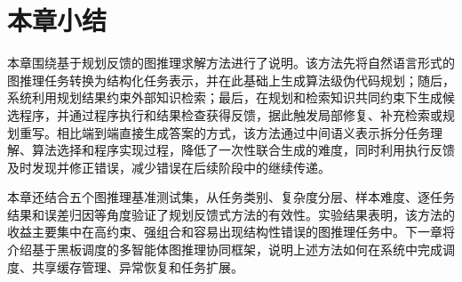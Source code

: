 

\section{本章小结}

本章围绕基于规划反馈的图推理求解方法进行了说明。该方法先将自然语言形式的图推理任务转换为结构化任务表示，并在此基础上生成算法级伪代码规划；随后，系统利用规划结果约束外部知识检索；最后，在规划和检索知识共同约束下生成候选程序，并通过程序执行和结果检查获得反馈，据此触发局部修复、补充检索或规划重写。相比端到端直接生成答案的方式，该方法通过中间语义表示拆分任务理解、算法选择和程序实现过程，降低了一次性联合生成的难度，同时利用执行反馈及时发现并修正错误，减少错误在后续阶段中的继续传递。

本章还结合五个图推理基准测试集，从任务类别、复杂度分层、样本难度、逐任务结果和误差归因等角度验证了规划反馈式方法的有效性。实验结果表明，该方法的收益主要集中在高约束、强组合和容易出现结构性错误的图推理任务中。下一章将介绍基于黑板调度的多智能体图推理协同框架，说明上述方法如何在系统中完成调度、共享缓存管理、异常恢复和任务扩展。

